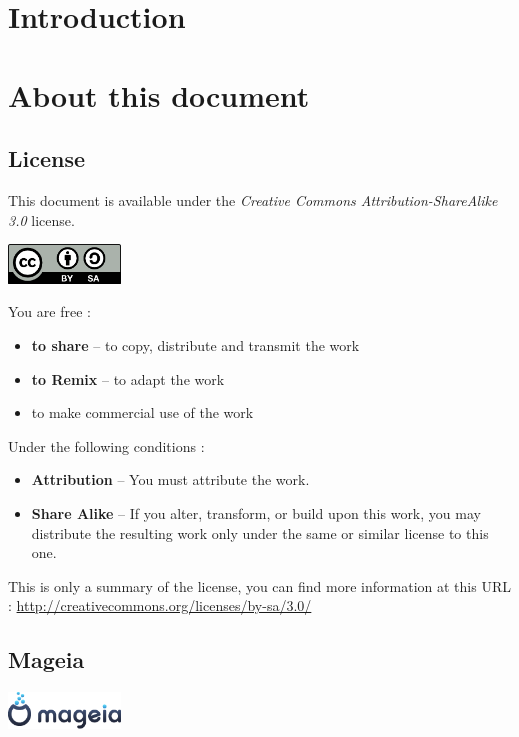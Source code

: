 \documentclass[a4paper,12pt]{article}
\begin{document}
\tableofcontents
\cleardoublepage

\section{Introduction}

\cleardoublepage
\section{About this document}
\subsection{License}

This document is available under the \emph{Creative Commons
Attribution-ShareAlike 3.0} license. 

\hfill \includegraphics[width=3cm]{by-sa.png}

You are free :
\begin{itemize}
\item \textbf{to share} -- to copy, distribute and transmit the work
\item \textbf{to Remix} -- to adapt the work
\item to make commercial use of the work
\end{itemize}

Under the following conditions :
\begin{itemize}
\item \textbf{Attribution} -- You must attribute the work.
\item \textbf{Share Alike} -- If you alter, transform, or build upon
      this work, you may distribute the resulting work only under the same or
      similar license to this one.
\end{itemize}

This is only a summary of the license, you can find more information at
this URL :
\url{http://creativecommons.org/licenses/by-sa/3.0/}

\cleardoublepage
\subsection{Mageia}
\hfill \includegraphics[width=3cm]{mageia-logo.png}
\end{document}
